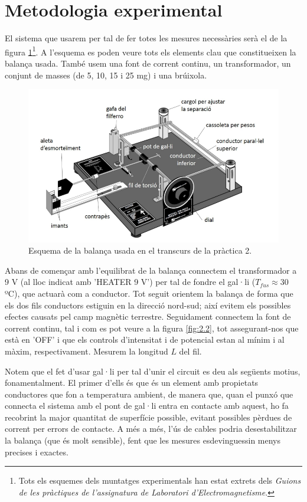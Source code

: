 \documentclass[a4paper,10.5pt]{report}
\begin{document}
\section{Metodologia experimental}

El sistema que usarem per tal de fer totes les mesures necessàries serà el de la figura \ref{fig:2.1}\footnote{Tots els esquemes dels muntatges experimentals han estat extrets dels \textit{Guions de les pràctiques de l'assignatura de Laboratori d'Electromagnetisme}\cite{ref3}.}. A l'esquema es poden veure tots els elements clau que constitueixen la balança usada. També usem una font de corrent continu, un transformador, un conjunt de masses (de 5, 10, 15 i 25 mg) i una brúixola.

\begin{figure}[h]
	\centering
	\includegraphics[width=0.6\linewidth]{screenshot008}
	\caption{Esquema de la balança usada en el transcurs de la pràctica 2.}
	\label{fig:2.1}
\end{figure}

Abans de començar amb l'equilibrat de la balança connectem el transformador a 9 V (al lloc indicat amb 'HEATER 9 V') per tal de fondre el gal·li ($T_{fus} \approx 30$ ºC), que actuarà com a conductor. Tot seguit orientem la balança de forma que els dos fils conductors estiguin en la direcció nord-sud; així evitem els possibles efectes causats pel camp magnètic terrestre. Seguidament connectem la font de corrent continu, tal i com es pot veure a la figura \ref{fig:2.2}, tot assegurant-nos que està en 'OFF' i que els controls d'intensitat i de potencial estan al mínim i al màxim, respectivament. Mesurem la longitud $L$ del fil.

Notem que el fet d'usar gal·li per tal d'unir el circuit es deu als següents motius, fonamentalment. El primer d'ells és que és un element amb propietats conductores que fon a temperatura ambient, de manera que, quan el punxó que connecta el sistema amb el pont de gal·li entra en contacte amb aquest, ho fa recobrint la major quantitat de superfície possible, evitant possibles pèrdues de corrent per errors de contacte. A més a més, l'ús de cables podria desestabilitzar la balança (que és molt sensible), fent que les mesures esdevinguessin menys precises i exactes.
\end{document}
